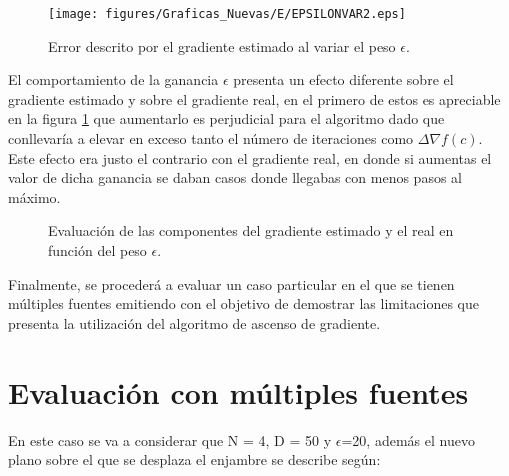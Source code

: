 \begin{figure}[H]
\centering
\texttt{[image: figures/Graficas\_Nuevas/E/EPSILONVAR2.eps]}
\caption{Error descrito por el gradiente estimado al variar el peso $\epsilon$.} \label{Epsilon_Var_Error}
\end{figure}

El comportamiento de la ganancia $\epsilon$ presenta un efecto diferente sobre el gradiente estimado y sobre el gradiente real, en el primero de estos es apreciable  en la figura \ref{Epsilon_Var_Error} que aumentarlo es perjudicial para el algoritmo dado que conllevaría a elevar en exceso tanto el número de iteraciones como $\Delta{\nabla{f\left(c\right)}}$. Este efecto era justo el contrario con el gradiente real, en donde si aumentas el valor de dicha ganancia se daban casos donde llegabas con menos pasos al máximo.

\begin{figure}[H]
  \begin{center}
    \caption{Evaluación de las componentes del gradiente estimado y el real en función del peso $\epsilon$.}
    \label{Gradiente_Var_Epsilon}
  \end{center}
\end{figure}

Finalmente, se procederá a evaluar un caso particular en el que se tienen múltiples fuentes emitiendo con el objetivo de demostrar las limitaciones que presenta la utilización del algoritmo de ascenso de gradiente.

\section{Evaluación con múltiples fuentes}

En este caso se va a considerar que N = 4, D = 50 y $\epsilon$=20, además el nuevo plano sobre el que se desplaza el enjambre se describe según:

